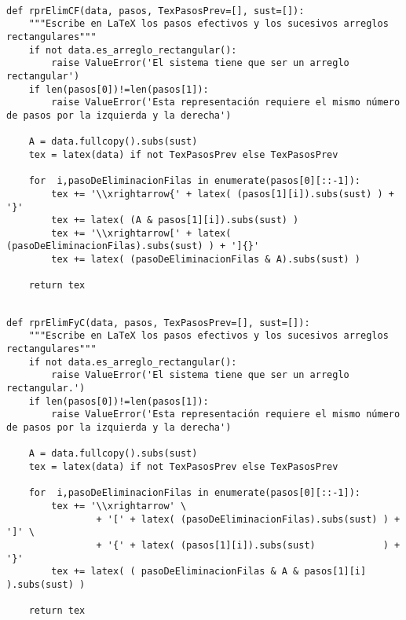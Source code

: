 \documentclass[11pt]{report}
\begin{document}
\begin{verbatim}

def rprElimCF(data, pasos, TexPasosPrev=[], sust=[]):
    """Escribe en LaTeX los pasos efectivos y los sucesivos arreglos rectangulares"""
    if not data.es_arreglo_rectangular():
        raise ValueError('El sistema tiene que ser un arreglo rectangular')
    if len(pasos[0])!=len(pasos[1]):
        raise ValueError('Esta representación requiere el mismo número de pasos por la izquierda y la derecha')
    
    A = data.fullcopy().subs(sust)                                                               
    tex = latex(data) if not TexPasosPrev else TexPasosPrev

    for  i,pasoDeEliminacionFilas in enumerate(pasos[0][::-1]):
        tex += '\\xrightarrow{' + latex( (pasos[1][i]).subs(sust) ) + '}'
        tex += latex( (A & pasos[1][i]).subs(sust) )
        tex += '\\xrightarrow[' + latex( (pasoDeEliminacionFilas).subs(sust) ) + ']{}' 
        tex += latex( (pasoDeEliminacionFilas & A).subs(sust) )
                                                               
    return tex

\end{verbatim}

\begin{verbatim}

def rprElimFyC(data, pasos, TexPasosPrev=[], sust=[]):
    """Escribe en LaTeX los pasos efectivos y los sucesivos arreglos rectangulares"""
    if not data.es_arreglo_rectangular():
        raise ValueError('El sistema tiene que ser un arreglo rectangular.')
    if len(pasos[0])!=len(pasos[1]):
        raise ValueError('Esta representación requiere el mismo número de pasos por la izquierda y la derecha')
    
    A = data.fullcopy().subs(sust)
    tex = latex(data) if not TexPasosPrev else TexPasosPrev

    for  i,pasoDeEliminacionFilas in enumerate(pasos[0][::-1]):
        tex += '\\xrightarrow' \
                + '[' + latex( (pasoDeEliminacionFilas).subs(sust) ) + ']' \
                + '{' + latex( (pasos[1][i]).subs(sust)            ) + '}'
        tex += latex( ( pasoDeEliminacionFilas & A & pasos[1][i] ).subs(sust) )
                                                               
    return tex

\end{verbatim}
\end{document}
